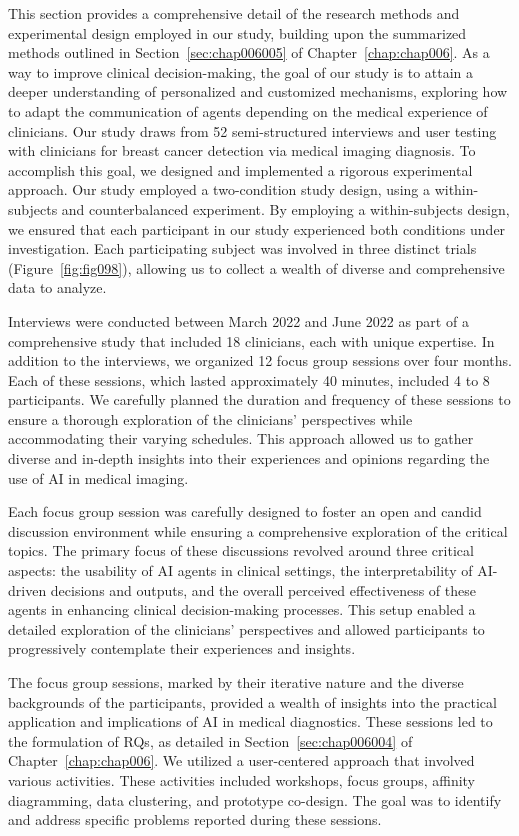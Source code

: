 This section provides a comprehensive detail of the research methods and experimental design employed in our study, building upon the summarized methods outlined in Section~\ref{sec:chap006005} of Chapter~\ref{chap:chap006}.
As a way to improve clinical decision-making, the goal of our study is to attain a deeper understanding of personalized and customized mechanisms, exploring how to adapt the communication of agents depending on the medical experience of clinicians.
Our study draws from 52 semi-structured interviews and user testing with clinicians for breast cancer detection via medical imaging diagnosis.
To accomplish this goal, we designed and implemented a rigorous experimental approach.
Our study employed a two-condition study design, using a within-subjects and counterbalanced experiment.
By employing a within-subjects design, we ensured that each participant in our study experienced both conditions under investigation.
Each participating subject was involved in three distinct trials (Figure~\ref{fig:fig098}), allowing us to collect a wealth of diverse and comprehensive data to analyze.

\textcolor{revised}{Interviews were conducted between March 2022 and June 2022 as part of a comprehensive study that included 18 clinicians, each with unique expertise.
In addition to the interviews, we organized 12 focus group sessions over four months.
Each of these sessions, which lasted approximately 40 minutes, included 4 to 8 participants.
We carefully planned the duration and frequency of these sessions to ensure a thorough exploration of the clinicians' perspectives while accommodating their varying schedules.
This approach allowed us to gather diverse and in-depth insights into their experiences and opinions regarding the use of \ac{AI} in medical imaging.}

\textcolor{revised}{Each focus group session was carefully designed to foster an open and candid discussion environment while ensuring a comprehensive exploration of the critical topics.
The primary focus of these discussions revolved around three critical aspects: the usability of \ac{AI} agents in clinical settings, the interpretability of \ac{AI}-driven decisions and outputs, and the overall perceived effectiveness of these agents in enhancing clinical decision-making processes.
This setup enabled a detailed exploration of the clinicians' perspectives and allowed participants to progressively contemplate their experiences and insights.}

\textcolor{revised}{The focus group sessions, marked by their iterative nature and the diverse backgrounds of the participants, provided a wealth of insights into the practical application and implications of \ac{AI} in medical diagnostics.
These sessions led to the formulation of \acp{RQ}, as detailed in Section~\ref{sec:chap006004} of Chapter~\ref{chap:chap006}.
We utilized a user-centered approach that involved various activities.
These activities included workshops, focus groups, affinity diagramming, data clustering, and prototype co-design.
The goal was to identify and address specific problems reported during these sessions.}

